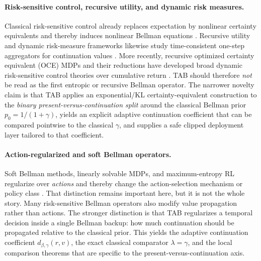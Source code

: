 \documentclass{article}
\theoremstyle{remark}
\begin{document}
\paragraph{Risk-sensitive control, recursive utility, and dynamic risk measures.}
Classical risk-sensitive control already replaces expectation by nonlinear certainty equivalents and thereby induces nonlinear Bellman equations \citep{howard1972risk,mihatsch2002risk}. Recursive utility and dynamic risk-measure frameworks likewise study time-consistent one-step aggregators for continuation values \citep{kreps1978temporal,epstein1989substitution,follmer2016stochastic}. More recently, recursive optimized certainty equivalent (OCE) MDPs and their reductions have developed broad dynamic risk-sensitive control theories over cumulative return \citep{xu2023recursiveoce,wang2025oce}. TAB should therefore \emph{not} be read as the first entropic or recursive Bellman operator. The narrower novelty claim is that TAB applies an exponential/KL certainty-equivalent construction to the \emph{binary present-versus-continuation split} around the classical Bellman prior $p_0=1/(1+\gamma)$, yields an explicit adaptive continuation coefficient that can be compared pointwise to the classical $\gamma$, and supplies a safe clipped deployment layer tailored to that coefficient.

\paragraph{Action-regularized and soft Bellman operators.}
Soft Bellman methods, linearly solvable MDPs, and maximum-entropy RL regularize over \emph{actions} and thereby change the action-selection mechanism or policy class \citep{todorov2007linearly,ziebart2008maximum,asadi2017alternative,haarnoja2018soft}. That distinction remains important here, but it is not the whole story. Many risk-sensitive Bellman operators also modify value propagation rather than actions. The stronger distinction is that TAB regularizes a temporal decision inside a single Bellman backup: how much continuation should be propagated relative to the classical prior. This yields the adaptive continuation coefficient $d_{\beta,\gamma}(r,v)$, the exact classical comparator $\lambda=\gamma$, and the local comparison theorems that are specific to the present-versus-continuation axis.
\end{document}
